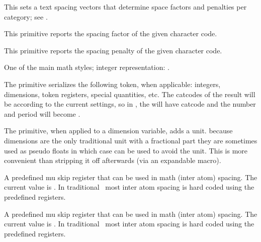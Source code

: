 This sets a text spacing vectors that determine space factors and penalties per
category; see .

\stopnewprimitive

\startnewprimitive[title={\prm {textspacingfactor}}]

This primitive reports the spacing factor of the given character code.

\stopnewprimitive

\startnewprimitive[title={\prm {textspacingpenalty}}]

This primitive reports the spacing penalty of the given character code.

\stopnewprimitive

\startoldprimitive[title={\prm {textstyle}}]

One of the main math styles; integer representation: \the\textstyle.

\stopoldprimitive

\startoldprimitive[title={\prm {the}}]

The  primitive serializes the following token, when applicable:
integers, dimensions, token registers, special quantities, etc. The catcodes of
the result will be according to the current settings, so in ,
the  will have catcode  and the number and period will
become .

\stopoldprimitive

\startnewprimitive[title={\prm {thewithoutunit}}]

The  primitive, when applied to a dimension variable, adds a 
unit. because dimensions are the only traditional unit with a fractional part
they are sometimes used as pseudo floats in which case  can
be used to avoid the unit. This is more convenient than stripping it off
afterwards (via an expandable macro).

\stopnewprimitive

\startoldprimitive[title={\prm {thickmuskip}}]

A predefined mu skip register that can be used in math (inter atom) spacing. The
current value is {\tt \the\thickmuskip}. In traditional \TEX\ most inter atom
spacing is hard coded using the predefined registers.

\stopoldprimitive

\startoldprimitive[title={\prm {thinmuskip}}]

A predefined mu skip register that can be used in math (inter atom) spacing. The
current value is {\tt \the\thinmuskip}. In traditional \TEX\ most inter atom
spacing is hard coded using the predefined registers.

